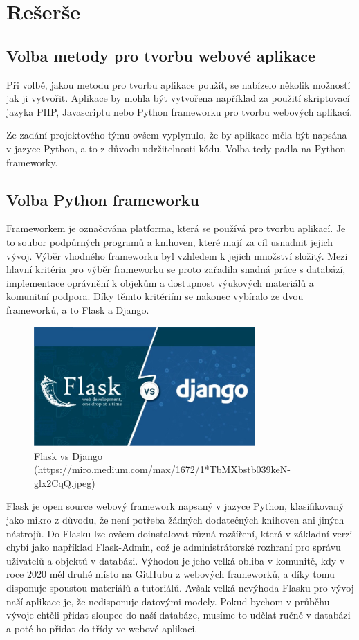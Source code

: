 \chapter{Rešerše}
\label{1-reserse}

\section{Volba metody pro tvorbu webové aplikace}

Při volbě, jakou metodu pro tvorbu aplikace použít, se nabízelo několik
možností jak ji vytvořit. Aplikace by mohla být vytvořena například za použití
skriptovací jazyka PHP, Javascriptu nebo Python frameworku 
pro tvorbu webových aplikací. 

Ze zadání projektového týmu ovšem vyplynulo, že by aplikace měla být
napsána v jazyce Python, a to z důvodu udržitelnosti kódu. Volba tedy
padla na Python frameworky.

\section{Volba Python frameworku}
Frameworkem je označována platforma, která se používá pro tvorbu aplikací. 
Je to soubor podpůrných programů a knihoven, které mají za cíl usnadnit 
jejich vývoj. Výběr vhodného frameworku byl vzhledem k jejich množství 
složitý. Mezi hlavní kritéria pro výběr frameworku se proto zařadila snadná
práce s databází, implementace oprávnění k objekům a dostupnost 
výukových materiálů a komunitní podpora. Díky těmto kritériím se nakonec 
vybíralo ze dvou frameworků, a to Flask a Django.

\begin{figure}[H] \centering
    \includegraphics[width=240pt]{./pictures/1-django-vs-flask.jpeg}
    \caption[Flask vs Django]{Flask vs Django (\url{https://miro.medium.com/max/1672/1*TbMXbstb039keN-glx2CqQ.jpeg)}}
	\label{fig:Flask vs Django}                                
\end{figure}

Flask je open source webový framework napsaný v jazyce Python, klasifikovaný
jako mikro z důvodu, že není potřeba žádných dodatečných knihoven ani
jiných nástrojů. Do Flasku lze ovšem doinstalovat různá rozšíření,
která v základní verzi chybí jako například Flask-Admin, což je
administrátorské rozhraní pro správu uživatelů a objektů v
databázi. Výhodou je jeho velká obliba v komunitě, kdy v roce 2020 měl
druhé místo na GitHubu z webových frameworků, a díky tomu disponuje
spoustou materiálů a tutoriálů. Avšak velká nevýhoda Flasku pro vývoj
naší aplikace je, že nedisponuje datovými modely. Pokud bychom v průběhu
vývoje chtěli přidat sloupec do naší databáze, musíme to udělat ručně
v databázi a poté ho přidat do třídy ve webové aplikaci. \cite{flask}

